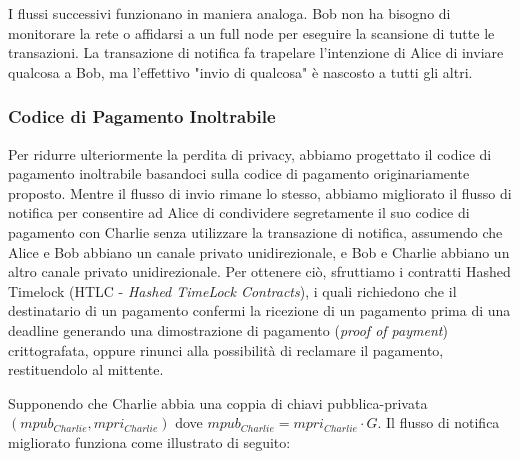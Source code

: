 I flussi successivi funzionano in maniera analoga.
Bob non ha bisogno di monitorare la rete o affidarsi a un full node per eseguire la scansione di tutte le transazioni. La transazione di notifica fa trapelare l'intenzione di Alice di inviare qualcosa a
Bob, ma l'effettivo "invio di qualcosa" è nascosto a tutti gli altri.

\subsubsection{Codice di Pagamento Inoltrabile}
Per ridurre ulteriormente la perdita di privacy, abbiamo progettato il codice di pagamento inoltrabile basandoci sulla codice di pagamento originariamente proposto. Mentre il flusso di invio rimane lo stesso, abbiamo migliorato il flusso di notifica per consentire ad Alice di condividere segretamente il suo codice di pagamento con Charlie senza utilizzare la transazione di notifica, assumendo che Alice e Bob abbiano un canale privato unidirezionale, e Bob e Charlie abbiano un altro
canale privato unidirezionale. Per ottenere ciò, sfruttiamo i contratti Hashed Timelock (HTLC - \emph{Hashed TimeLock Contracts}), i quali richiedono che il destinatario di un pagamento confermi la ricezione di un pagamento prima di una deadline generando una dimostrazione di pagamento (\emph{proof of payment}) crittografata, oppure rinunci alla possibilità di reclamare il pagamento, restituendolo al mittente.


Supponendo che Charlie abbia una coppia di chiavi pubblica-privata $(mpub_{Charlie}, mpri_{Charlie})$ dove $mpub_{Charlie} = mpri_{Charlie}\cdot G$. Il flusso di notifica migliorato funziona come illustrato di seguito:

